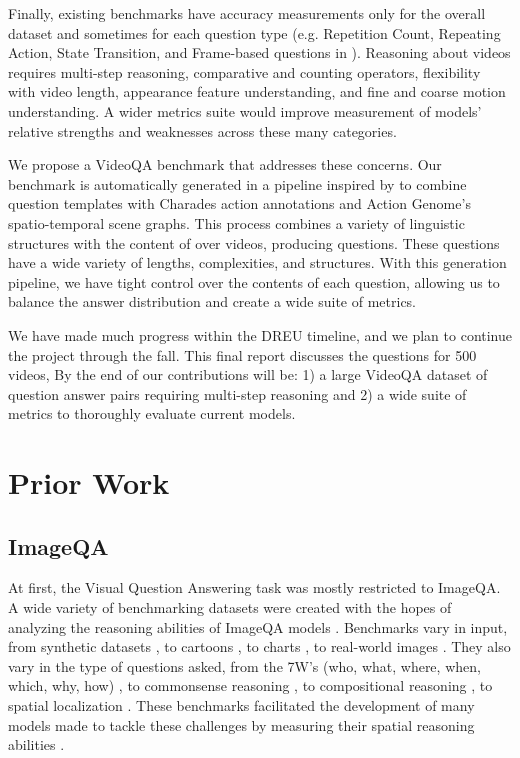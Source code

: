 \documentclass[10pt,twocolumn,letterpaper]{article}
\newcommand{\mgm}[1]{{\color{cyan}{mgm: #1}}}
\begin{document}
Finally, existing benchmarks have accuracy measurements only for the overall dataset and sometimes for each question type (e.g. Repetition Count, Repeating Action, State Transition, and Frame-based questions in \cite{jang2017tgif}). Reasoning about videos requires multi-step reasoning, comparative and counting operators, flexibility with video length, appearance feature understanding, and fine and coarse motion understanding. A wider metrics suite would improve measurement of models' relative strengths and weaknesses across these many categories.

We propose a VideoQA benchmark that addresses these concerns. Our benchmark is automatically generated in a pipeline inspired by \cite{hudson2019gqa} to combine question templates with Charades action annotations and Action Genome's spatio-temporal scene graphs. This process combines a variety of linguistic structures with the content of over \mgm{10,000} videos, producing \mgm{add here} questions. These questions have a wide variety of lengths, complexities, and structures. With this generation pipeline, we have tight control over the contents of each question, allowing us to balance the answer distribution and create a wide suite of metrics.

We have made much progress within the DREU timeline, and we plan to continue the project through the fall. This final report discusses the questions for 500 videos, \mgm{? template and ? question-answer pairs} By the end of our contributions will be: 1) a large VideoQA dataset of question answer pairs requiring multi-step reasoning and 2) a wide suite of metrics to thoroughly evaluate current models.

\section{Prior Work}

\subsection{ImageQA}

At first, the Visual Question Answering task was mostly restricted to ImageQA. A wide variety of benchmarking datasets were created with the hopes of analyzing the reasoning abilities of ImageQA models \cite{johnson2017clevr, hudson2019gqa, antol2015vqa, zellers2019recognition, goyal2017making, krishna2017visual, zhu2016visual7w, kim2020answering}. Benchmarks vary in input, from synthetic datasets \cite{johnson2017clevr}, to cartoons \cite{antol2015vqa}, to charts \cite{kim2017deepstory}, to real-world images \cite{hudson2019gqa, krishna2017visual, zhu2016visual7w, goyal2017making, zellers2019recognition, antol2015vqa}. They also vary in the type of questions asked, from the 7W's (who, what, where, when, which, why, how) \cite{zhu2016visual7w}, to commonsense reasoning \cite{zellers2019recognition}, to compositional reasoning \cite{johnson2017clevr, hudson2019gqa}, to spatial localization \cite{zhu2016visual7w, krishna2017visual, hudson2019gqa}. These benchmarks facilitated the development of many models made to tackle these challenges by measuring their spatial reasoning abilities \cite{johnson2017clevr, hudson2019gqa, krishna2017visual}. 
\end{document}
